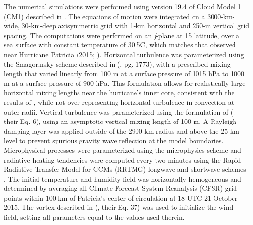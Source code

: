 \documentclass{ametsoc}
\begin{document}
The numerical simulations were performed using version 19.4 of Cloud Model 1 (CM1) described in \cite{BryanRotunno2009}.
The equations of motion were integrated on a 3000-km-wide, 30-km-deep axisymmetric grid with 1-km horizontal and 250-m vertical grid spacing.
The computations were performed on an \textit{f}-plane at 15 latitude, over a sea surface with constant temperature of 30.5\textdegree C, which matches that observed near Hurricane Patricia (2015; \citeauthor{Kimberlainetal2016} \citeyear{Kimberlainetal2016}).
Horizontal turbulence was parameterized using the Smagorinsky scheme described in \citeauthor{BryanRotunno2009} (\citeyear{BryanRotunno2009}, pg. 1773), with a prescribed mixing length that varied linearly from 100 m at a surface pressure of 1015 hPa to 1000 m at a surface pressure of 900 hPa.
This formulation allows for realistically-large horizontal mixing lengths near the hurricane's inner core, consistent with the results of \cite{Bryan2012}, while not over-representing horizontal turbulence in convection at outer radii.
Vertical turbulence was parameterized using the formulation of \citeauthor{MarkowskiBryan2016} (\citeyear{MarkowskiBryan2016}, their Eq. 6), using an asymptotic vertical mixing length of 100 m.
A Rayleigh damping layer was applied outside of the 2900-km radius and above the 25-km level to prevent spurious gravity wave reflection at the model boundaries.
Microphysical processes were parameterized using the \cite{Thompson} microphysics scheme and radiative heating tendencies were computed every two minutes using the Rapid Radiative Transfer Model for GCMs (RRTMG) longwave and shortwave schemes \citep{Iacono}.
The initial temperature and humidity field was horizontally homogeneous and determined by averaging all Climate Forecast System Reanalysis (CFSR) grid points within 100 km of Patricia's center of circulation at 18 UTC 21 October 2015.
The vortex described in \citeauthor{RotunnoEmanuel} (\citeyear{RotunnoEmanuel}, their Eq. 37) was used to initialize the wind field, setting all parameters equal to the values used therein.
\end{document}
